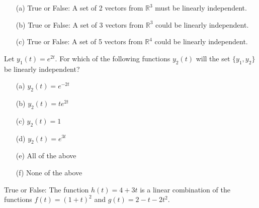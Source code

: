 \begin{problem}
    \begin{enumerate}
        \item[(a)] True or False:  A set of 2 vectors from $\mathbb{R}^3$ must be linearly independent.
        \item[(b)] True or False: A set of 3 vectors from $\mathbb{R}^3$ could be linearly independent.
    \item[(c)] True or False: A set of 5 vectors from $\mathbb{R}^4$ could be linearly independent.
\end{enumerate}
\end{problem}

\begin{problem}
    Let $y_1(t) = e^{2t}$. For which of the following functions $y_2(t)$ will the set
    $\{y_1,y_2\}$ be linearly independent?
    \begin{enumerate}
        \item[(a)] $y_2(t) = e^{-2t}$
        \item[(b)] $y_2(t) = te^{2t}$
        \item[(c)] $y_2(t) = 1$
        \item[(d)] $y_2(t) = e^{3t}$
        \item[(e)] All of the above
        \item[(f)] None of the above
    \end{enumerate}
\end{problem}

%             

\begin{problem}
    True or False: The function $h(t) = 4+3t$ is a linear combination of the functions
    $f(t) = (1+t)^2$ and $g(t) = 2 - t - 2t^2$.
\end{problem}

%             

